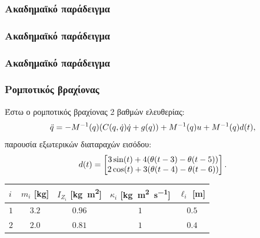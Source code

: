 \documentclass{beamer}
\begin{document}
    \begin{frame}
        \frametitle{Ακαδημαϊκό παράδειγμα}
        
    \end{frame}
    
    \begin{frame}
        \frametitle{Ακαδημαϊκό παράδειγμα}
        
    \end{frame}
    
    \begin{frame}
        \frametitle{Ακαδημαϊκό παράδειγμα}
        
    \end{frame}
    
    \begin{frame}
        \frametitle{Ρομποτικός βραχίονας}
        Έστω ο ρομποτικός βραχίονας 2 βαθμών ελευθερίας:
        \[
            \ddot q = - M^{-1}(q) \pqty{C(q,\dot q)\dot q + g(q)} + M^{-1}(q)u + M^{-1}(q)d(t),
        \]
        παρουσία εξωτερικών διαταραχών εισόδου:
        \[
            d(t) = \bmqty{
                3\sin(t) + 4 \pqty{\theta(t-3) - \theta(t-5)}\\
                2\cos(t) + 3 \pqty{\theta(t-4) - \theta(t-6)}
            }.
        \]
        
        \pause
        \begin{center}
            \begin{tabular}{lcccc}
                \toprule
                $i$ & $m_i$ [\si{\kilogram}] & $I_{Z_i}$ [\si{\kilogram\metre^2}] & $\kappa_i$ [\si{\kilogram\metre^2\per\second}] & $\ell_i$ [\si{\metre}]\\ \midrule
                $1$ & $3.2$ & $0.96$ & $1$ & $0.5$ \\
                $2$ & $2.0$ & $0.81$ & $1$ & $0.4$ \\ \bottomrule
            \end{tabular}
        \end{center}
    \end{frame}
    
\end{document}
